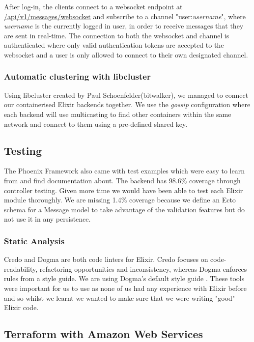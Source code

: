 \documentclass[11pt,a4paper]{report}
\begin{document}
After log-in, the clients connect to a websocket endpoint at \url{/api/v1/messages/websocket} and subscribe to a channel "user:\emph{username}", where \emph{username} is the currently logged in user, in order to receive messages that they are sent in real-time. The connection to both the websocket and channel is authenticated where only valid authentication tokens are accepted to the websocket and a user is only allowed to connect to their own designated channel.

\subsubsection{Automatic clustering with libcluster}

Using libcluster created by Paul Schoenfelder(bitwalker), we managed to connect our containerised Elixir backends together. We use the \textit{gossip} configuration where each backend will use multicasting to find other containers within the same network and connect to them using a pre-defined shared key.

\subsection{Testing}

The Phoenix Framework also came with test examples which were easy to learn from and find documentation about. The backend has 98.6\% coverage through controller testing. Given more time we would have been able to test each Elixir module thoroughly. We are missing 1.4\% coverage because we define an Ecto schema for a Message model to take advantage of the validation features but do not use it in any persistence.

\subsubsection{Static Analysis}

Credo and Dogma are both code linters for Elixir. Credo focuses on code-readability, refactoring opportunities and inconsistency, whereas Dogma enforces rules from a style guide. We are using Dogma's default style guide \cite{website:elixir_dogma_rules}. These tools were important for us to use as none of us had any experience with Elixir before and so whilst we learnt we wanted to make sure that we were writing "good" Elixir code.

\subsection{Terraform with Amazon Web Services}
\end{document}
